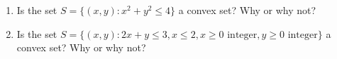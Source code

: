 \documentclass[11pt]{article}
\theoremstyle{definition}
\begin{document}
\begin{enumerate}
\item Is the set $S = \{(x,y): x^2 + y^2 \leq 4\}$ a convex set? Why or why not?

\item Is the set $S = \{(x,y): 2x + y \leq 3, x \leq 2, x\geq 0 \text{ integer}, y \geq 0 \text{ integer}\}$ a convex set? Why or why not?
\end{enumerate}
\end{document}
